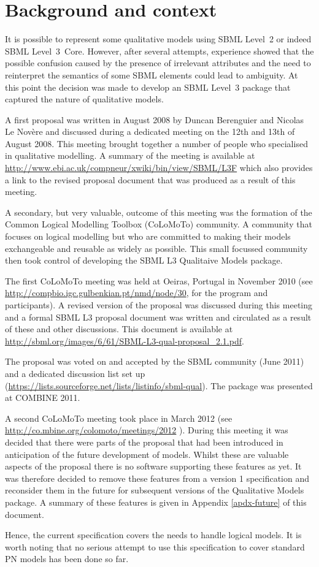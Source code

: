 
\section{Background and context}
\label{background}

It is possible to represent some qualitative models using SBML Level~2 or indeed SBML Level~3~Core. However,  after several attempts, experience showed that the possible confusion caused by the presence of irrelevant attributes and the need to reinterpret the semantics of some SBML elements could lead to ambiguity. At this point the decision was made to develop an SBML Level~3 package that captured the nature of qualitative models.


A first proposal was written in August 2008 by Duncan Berenguier and Nicolas Le Nov\`ere and discussed during a dedicated meeting on the 12th and 13th of August 2008. This meeting brought together a number of people who specialised in qualitative modelling. A summary of the meeting is available at \url{http://www.ebi.ac.uk/compneur/xwiki/bin/view/SBML/L3F} which also provides a link to the revised proposal document that was produced as a result of this meeting.

A secondary, but very valuable, outcome of this meeting was the formation of the Common Logical Modelling Toolbox (CoLoMoTo) community. A community that focuses on logical modelling but who are committed to making their models exchangeable and reusable as widely as possible.  This small focussed community then took control of developing the SBML L3 Qualitaive Models package.

The first CoLoMoTo meeting was held at Oeiras, Portugal in November 2010 (see \url{http://compbio.igc.gulbenkian.pt/nmd/node/30}, for the program and participants). A revised version of the proposal was discussed during this meeting and a formal SBML L3 proposal document was written and circulated as a result of these and other discussions.
This document is available at \url{http://sbml.org/images/6/61/SBML-L3-qual-proposal_2.1.pdf}.

The proposal was voted on and accepted by the SBML community (June 2011) and a dedicated discussion list set up (\url{https://lists.sourceforge.net/lists/listinfo/sbml-qual}). The package was presented at COMBINE 2011.

A second CoLoMoTo meeting took place in March 2012 (see \url{http://co.mbine.org/colomoto/meetings/2012} ). During this meeting it was decided that there were parts of the proposal that had been introduced in anticipation of the future development of models. Whilst these are valuable aspects of the proposal there is no software supporting these features as yet. It was therefore decided to remove these features from a version 1 specification and reconsider them in the future for subsequent versions of the Qualitative Models package. A summary of these features is given in Appendix \ref{apdx-future} of this document.

Hence, the current specification covers the needs to handle logical
models. It is worth noting that no serious attempt to use this
specification to cover standard PN models has been done so far.

